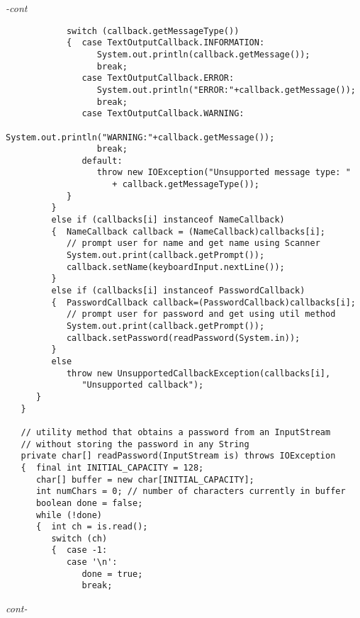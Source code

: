 \begin{figure*}\begin{program}\emph{-cont}\begin{verbatim}
            switch (callback.getMessageType())
            {  case TextOutputCallback.INFORMATION:
                  System.out.println(callback.getMessage());
                  break;
               case TextOutputCallback.ERROR:
                  System.out.println("ERROR:"+callback.getMessage());
                  break;
               case TextOutputCallback.WARNING:
                  System.out.println("WARNING:"+callback.getMessage());
                  break;
               default:
                  throw new IOException("Unsupported message type: "
                     + callback.getMessageType());
            }
         }
         else if (callbacks[i] instanceof NameCallback)
         {  NameCallback callback = (NameCallback)callbacks[i];
            // prompt user for name and get name using Scanner
            System.out.print(callback.getPrompt());
            callback.setName(keyboardInput.nextLine());
         }
         else if (callbacks[i] instanceof PasswordCallback)
         {  PasswordCallback callback=(PasswordCallback)callbacks[i];
            // prompt user for password and get using util method
            System.out.print(callback.getPrompt());
            callback.setPassword(readPassword(System.in));
         }
         else
            throw new UnsupportedCallbackException(callbacks[i],
               "Unsupported callback");
      }
   }

   // utility method that obtains a password from an InputStream
   // without storing the password in any String
   private char[] readPassword(InputStream is) throws IOException
   {  final int INITIAL_CAPACITY = 128;
      char[] buffer = new char[INITIAL_CAPACITY];
      int numChars = 0; // number of characters currently in buffer
      boolean done = false;
      while (!done)
      {  int ch = is.read();
         switch (ch)
         {  case -1:
            case '\n':
               done = true;
               break;
\end{verbatim}\hfill \emph{cont-}\end{program}\end{figure*}%

